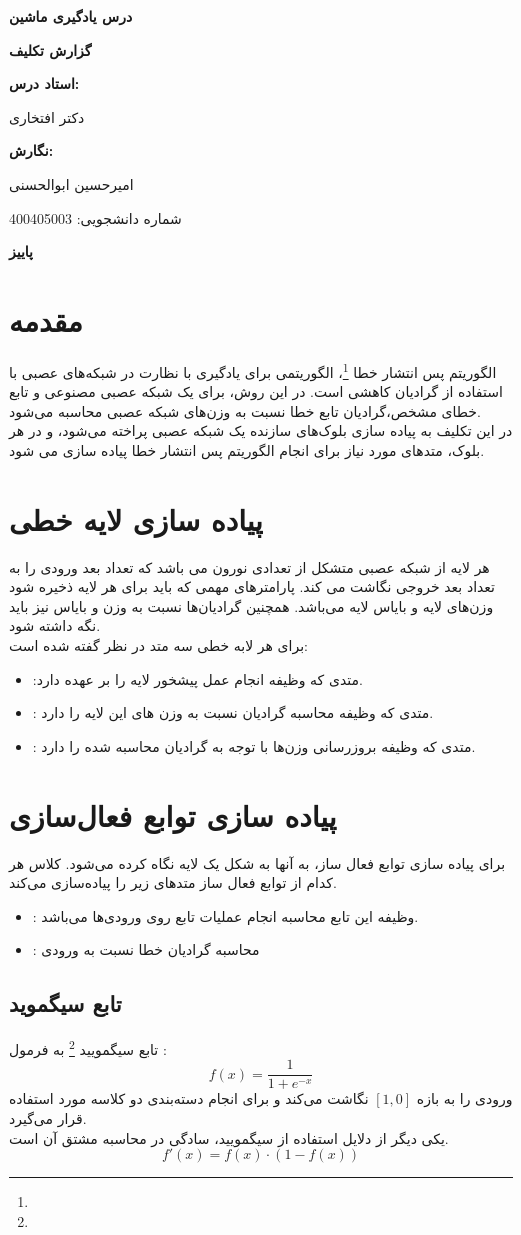 \documentclass[11pt]{article}
\def\maketitle{
	\begin{titlepage}
		\begin{center}
			\vspace*{2cm}
			
			{\Large\bfseries درس یادگیری ماشین\par}
			\vspace{2cm}
			
			{\Huge\bfseries گزارش تکلیف
				\lr{Backpropagation}\par}
			\vspace{3cm}
			
			{\large\bfseries استاد درس:\par}
			{\large دکتر افتخاری\par}
			\vspace{1.5cm}
			
			{\large\bfseries نگارش:\par}
			{\large امیرحسین ابوالحسنی\par}
			{\large شماره دانشجویی: 400405003\par}
			\vspace{2cm}
			
			\vfill  %
			
			{\large\bfseries پاییز \lr{1403}}
			
		\end{center}
	\end{titlepage}
	\setcounter{page}{1}
}
\begin{document}
	\maketitle	
	\tableofcontents
	\newpage
	\section{مقدمه}
	الگوریتم پس انتشار خطا
	\footnote{}،
	الگوریتمی برای یادگیری با نظارت در شبکه‌های عصبی با استفاده از گرادیان کاهشی است. در این روش، برای یک شبکه عصبی مصنوعی و تابع خطای مشخص،‌گرادیان تابع خطا نسبت به وزن‌های شبکه عصبی محاسبه می‌‌شود.\\
	در این تکلیف به پیاده سازی بلوک‌های سازنده یک شبکه عصبی پراخته می‌شود، و در هر بلوک، متد‌های مورد نیاز برای انجام الگوریتم پس انتشار خطا پیاده سازی می شود.
	\section{پیاده سازی لایه خطی}
	هر لایه از شبکه عصبی متشکل از تعدادی نورون می باشد که تعداد بعد ورودی را به تعداد بعد خروجی نگاشت می کند. پارامتر‌های مهمی که باید برای هر لایه ذخیره شود وزن‌های لایه‌ و بایاس لایه می‌باشد. همچنین گرادیان‌ها نسبت به وزن و بایاس نیز باید نگه داشته شود.\\
	برای هر لابه خطی سه متد در نظر گفته شده است:
	\begin{itemize}
		\item {} :‌متدی که وظیفه انجام عمل پیشخور لایه را بر عهده دارد.
		\item {} : متدی که وظیفه محاسبه گرادیان نسبت به وزن های این لایه را دارد.
		\item {}: متدی که وظیفه بروزرسانی وزن‌ها با توجه به گرادیان محاسبه شده را دارد.
	\end{itemize}
	\section{پیاده سازی توابع فعال‌سازی}
	برای پیاده سازی توابع فعال ساز، به آنها به شکل یک لایه نگاه کرده می‌شود. کلاس هر کدام از توابع فعال ساز متدهای زیر را پیاده‌سازی می‌کند.
	\begin{itemize}
		\item {}: وظیفه این تابع محاسبه انجام عملیات تابع روی ورودی‌ها می‌باشد.
		\item {}: محاسبه گرادیان خطا نسبت به ورودی
	\end{itemize}
	\subsection{تابع سیگموید}
	تابع سیگمویید
	\footnote{}
	 به فرمول :
	\[ f(x) = \frac{1}{1 + e^{-x}} \]
	ورودی را به بازه $[1, 0]$ نگاشت می‌کند و برای انجام دسته‌بندی دو کلاسه مورد استفاده قرار می‌گیرد.\\
	یکی دیگر از دلایل استفاده از سیگمویید، سادگی در محاسبه مشتق آن است.
	\[ f'(x) = f(x)\cdot (1 - f(x)) \]
	\newpage
\end{document}
